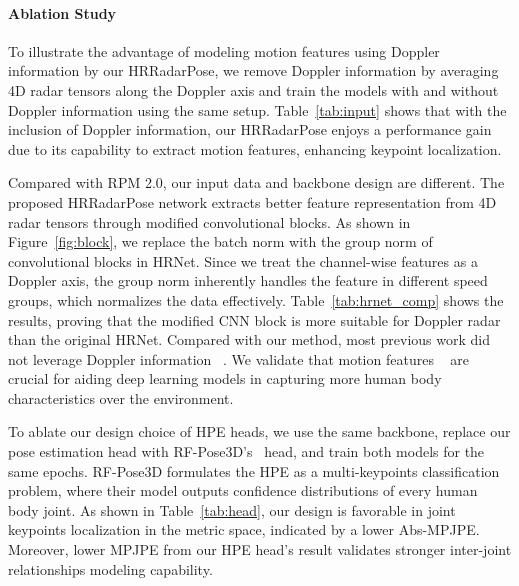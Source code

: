 \paragraph{Ablation Study}

To illustrate the advantage of modeling motion features using Doppler information by our HRRadarPose, we remove Doppler information by averaging 4D radar tensors along the Doppler axis and train the models with and without Doppler information using the same setup. 
Table~\ref{tab:input} shows that with the inclusion of Doppler information, our HRRadarPose enjoys a performance gain due to its capability to extract motion features, enhancing keypoint localization.



Compared with RPM 2.0, our input data and backbone design are different. 
The proposed HRRadarPose network extracts better feature representation from 4D radar tensors through modified convolutional blocks. 
As shown in Figure~\ref{fig:block}, we replace the batch norm with the group norm of convolutional blocks in HRNet. Since we treat the channel-wise features as a Doppler axis, the group norm inherently handles the feature in different speed groups, which normalizes the data effectively. 
Table~\ref{tab:hrnet_comp} shows the results, proving that the modified CNN block is more suitable for Doppler radar than the original HRNet.
Compared with our method, most previous work did not leverage Doppler information ~\cite{xie2023rpm,yu2023mobirfpose}. 
We validate that motion features ~\cite{huang2023observation,lin2015position} are crucial for aiding deep learning models in capturing more human body characteristics over the environment. 

To ablate our design choice of HPE heads, we use the same backbone, replace our pose estimation head with RF-Pose3D's~\cite{zhao2018rf} head, and train both models for the same epochs. 
RF-Pose3D formulates the HPE as a multi-keypoints classification problem, where their model outputs confidence distributions of every human body joint. 
As shown in Table~\ref{tab:head}, our design is favorable in joint keypoints localization in the metric space, indicated by a lower Abs-MPJPE. 
Moreover, lower MPJPE from our HPE head's result validates stronger inter-joint relationships modeling capability.
